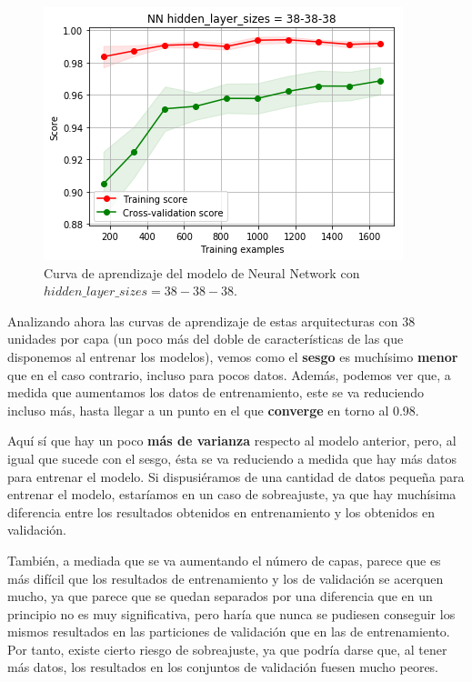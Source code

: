 \documentclass[11pt,a4paper]{article}
\begin{document}
\begin{figure}[H]
    \centering
    \includegraphics[scale=0.5]{img/lc-nn-38-38-38.png}
    \caption{Curva de aprendizaje del modelo de Neural Network con $hidden\_layer\_sizes=38-38-38$.}
    \label{fig:lc-nn-38-38-38}
\end{figure}

Analizando ahora las curvas de aprendizaje de estas arquitecturas con 38 unidades por capa (un poco más del doble de características de las
que disponemos al entrenar los modelos), vemos como el \textbf{sesgo} es muchísimo \textbf{menor} que en el caso contrario, incluso para pocos datos. 
Además, podemos ver que, a medida que aumentamos los datos de entrenamiento, este se va reduciendo incluso más, hasta llegar a un punto en el que
\textbf{converge} en torno al 0.98.

Aquí sí que hay un poco \textbf{más de varianza} respecto al modelo anterior, pero, al igual que sucede con
el sesgo, ésta se va reduciendo a medida que hay más datos para entrenar el modelo. Si dispusiéramos de una cantidad de datos pequeña para entrenar el
modelo, estaríamos en un caso de sobreajuste, ya que hay muchísima diferencia entre los resultados obtenidos en entrenamiento y los obtenidos en validación.

También, a mediada que se va aumentando el número de capas, parece que es más difícil que los resultados de entrenamiento y los de validación se acerquen
mucho, ya que parece que se quedan separados por una diferencia que en un principio no es muy significativa, pero haría que nunca se pudiesen conseguir los
mismos resultados en las particiones de validación que en las de entrenamiento. Por tanto, existe cierto riesgo de sobreajuste, ya que podría darse
que, al tener más datos, los resultados en los conjuntos de validación fuesen mucho peores.
\end{document}
